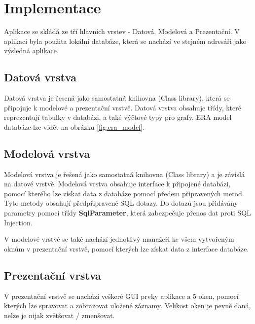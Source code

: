 \documentclass[12pt, a4paper]{article}
\begin{document}
\newpage
\section{Implementace}
Aplikace se skládá ze tří hlavních vrstev - Datová, Modelová a Prezentační. V aplikaci byla použita lokální databáze, která se nachází ve stejném adresáři jako výsledná aplikace.
\subsection{Datová vrstva}
Datová vrstva je řesená jako samostatná knihovna (Class library), která se připojuje k modelové a prezentační vrstvě. Datová vrstva obsahuje třídy, které reprezentují tabulky v databázi, a také výčtové typy pro grafy. ERA model databáze lze vidět na obrázku \ref{fig:era_model}.

\subsection{Modelová vrstva}
Modelová vrstva je řešená jako samostatná knihovna (Class library) a je závislá na datové vrstvě. Modelová vrstva obsahuje interface k připojené databázi, pomocí kterého lze získat data z databáze pomocí předem připravených metod. Tyto metody obsahují předpřipravené SQL dotazy. Do dotazů jsou přidávány parametry pomocí třídy \textbf{SqlParameter}, která zabezpečuje přenos dat proti SQL Injection.

V modelové vrstvě se také nachází jednotlivý manažeři ke všem vytvořeným oknům v prezentační vrstvě, pomocí kterých lze získat data z interface databáze.

\subsection{Prezentační vrstva}
V prezentační vrstvě se nachází veškeré GUI prvky aplikace a 5 oken, pomocí kterých lze spravovat a zobrazovat uložené záznamy. Velikost oken je pevně daná, nelze je nijak zvětšovat / zmenšovat.
\end{document}
